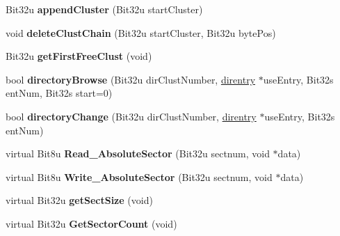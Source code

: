 \begin{DoxyCompactItemize}
\item 
\hypertarget{classfatDrive_a06109e670f9aea5c4dd11d07c50ae240}{Bit32u {\bfseries append\-Cluster} (Bit32u start\-Cluster)}\label{classfatDrive_a06109e670f9aea5c4dd11d07c50ae240}

\item 
\hypertarget{classfatDrive_acdf76d8c0cefb8fa35d3bbbaea54c8e0}{void {\bfseries delete\-Clust\-Chain} (Bit32u start\-Cluster, Bit32u byte\-Pos)}\label{classfatDrive_acdf76d8c0cefb8fa35d3bbbaea54c8e0}

\item 
\hypertarget{classfatDrive_a629d48445667f2662cc360ccaef4b43e}{Bit32u {\bfseries get\-First\-Free\-Clust} (void)}\label{classfatDrive_a629d48445667f2662cc360ccaef4b43e}

\item 
\hypertarget{classfatDrive_accabf68f45861dba60d9c93981c816c4}{bool {\bfseries directory\-Browse} (Bit32u dir\-Clust\-Number, \hyperlink{structdirentry}{direntry} $\ast$use\-Entry, Bit32s ent\-Num, Bit32s start=0)}\label{classfatDrive_accabf68f45861dba60d9c93981c816c4}

\item 
\hypertarget{classfatDrive_a33bfa188995f1f5bf813af5a5b8e24ba}{bool {\bfseries directory\-Change} (Bit32u dir\-Clust\-Number, \hyperlink{structdirentry}{direntry} $\ast$use\-Entry, Bit32s ent\-Num)}\label{classfatDrive_a33bfa188995f1f5bf813af5a5b8e24ba}

\item 
\hypertarget{classfatDrive_a0347726faa951ece86554389c1582365}{virtual Bit8u {\bfseries Read\-\_\-\-Absolute\-Sector} (Bit32u sectnum, void $\ast$data)}\label{classfatDrive_a0347726faa951ece86554389c1582365}

\item 
\hypertarget{classfatDrive_a0a2171e173e8718bc73b2a4ce7493aa6}{virtual Bit8u {\bfseries Write\-\_\-\-Absolute\-Sector} (Bit32u sectnum, void $\ast$data)}\label{classfatDrive_a0a2171e173e8718bc73b2a4ce7493aa6}

\item 
\hypertarget{classfatDrive_a8eec794d6977defe23a899c4ced8344d}{virtual Bit32u {\bfseries get\-Sect\-Size} (void)}\label{classfatDrive_a8eec794d6977defe23a899c4ced8344d}

\item 
\hypertarget{classfatDrive_a68587a6fcf5718c6af4c1d38b2ffffbc}{virtual Bit32u {\bfseries Get\-Sector\-Count} (void)}\label{classfatDrive_a68587a6fcf5718c6af4c1d38b2ffffbc}


\end{DoxyCompactItemize}
